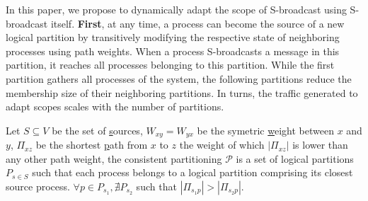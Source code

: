 
In this paper, we propose to dynamically adapt the scope of
S-broadcast using S-broadcast itself.  \textbf{First}, at any time, a
process can become the source of a new logical partition by
transitively modifying the respective state of neighboring processes
using path weights.  When a process S-broadcasts a message in this
partition, it reaches all processes belonging to this partition. While
the first partition gathers all processes of the system, the following
partitions reduce the membership size of their neighboring
partitions. In turns, the traffic generated to adapt scopes scales
with the number of partitions.
 
\begin{definition}
  Let $S \subseteq V$ be the set of \underline{s}ources, $W_{xy} =
  W_{yx}$ be the symetric \underline{w}eight between $x$ and $y$,
  $\Pi_{xz}$ be the shortest \underline{p}ath from $x$ to $z$ the
  weight of which $|\Pi_{xz}|$ is lower than any other path weight,
  the consistent partitioning $\mathcal{P}$ is a set of logical
  partitions $P_{s\in S}$ such that each process belongs to a logical
  partition comprising its closest source process.  $\forall p \in
  P_{s_1}, \nexists P_{s_2}$ such that $|\Pi_{s_1p}| > |\Pi_{s_2p}|$.
\end{definition}



